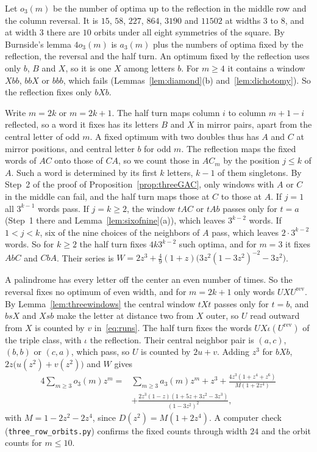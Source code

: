 \begin{remark}\label{rem:threeorbits}
Let $o_3(m)$ be the number of optima up to the reflection in the middle row and the column
reversal. It is $15$, $58$, $227$, $864$, $3190$ and $11502$ at widths $3$ to $8$, and at
width $3$ there are $10$ orbits under all eight symmetries of the square. By Burnside's lemma
$4o_3(m)$ is $a_3(m)$ plus the numbers of optima fixed by the reflection, the reversal and the
half turn. An optimum fixed by the reflection uses only $b$, $B$ and $X$, so it is one $X$
among letters $b$. For $m\ge4$ it contains a window $Xbb$, $bbX$ or $bbb$, which fails
(Lemmas~\ref{lem:diamond}(b) and~\ref{lem:dichotomy}). So the reflection fixes only $bXb$.

Write $m=2k$ or $m=2k+1$. The half turn maps column $i$ to column $m+1-i$ reflected, so a word
it fixes has its letters $B$ and $X$ in mirror pairs, apart from the central letter of odd $m$.
A fixed optimum with two doubles thus has $A$ and $C$ at mirror positions, and central letter
$b$ for odd $m$. The reflection maps the fixed words of $AC$ onto those of $CA$, so we count
those in $AC_m$ by the position $j\le k$ of $A$. Such a word is determined by its first $k$
letters, $k-1$ of them singletons. By Step~2 of the proof of Proposition~\ref{prop:threeGAC},
only windows with $A$ or $C$ in the middle can fail, and the half turn maps those at $C$ to
those at $A$. If $j=1$ all $3^{k-1}$ words pass. If $j=k\ge2$, the window $tAC$ or $tAb$ passes
only for $t=a$ (Step~1 there and Lemma~\ref{lem:sixofnine}(a)), which leaves $3^{k-2}$ words. If
$1<j<k$, six of the nine choices of the neighbors of $A$ pass, which leaves $2\cdot3^{k-2}$
words. So for $k\ge2$ the half turn fixes $4k3^{k-2}$ such optima, and for $m=3$ it fixes $AbC$
and $CbA$. Their series is $W=2z^3+\frac49(1+z)\bigl(3z^2(1-3z^2)^{-2}-3z^2\bigr)$.

A palindrome has every letter off the center an even number of times. So the reversal fixes no
optimum of even width, and for $m=2k+1$ only words $UXU^{\mathrm{rev}}$. By
Lemma~\ref{lem:threewindows} the central window $tXt$ passes only for $t=b$, and $bsX$ and $Xsb$
make the letter at distance two from $X$ outer, so $U$ read outward from $X$ is counted by $v$
in~\eqref{eq:runs}. The half turn fixes the words $UX\iota(U^{\mathrm{rev}})$ of the triple
class, with $\iota$ the reflection. Their central neighbor pair is $(a,c)$, $(b,b)$ or $(c,a)$,
which pass, so $U$ is counted by $2u+v$. Adding $z^3$ for $bXb$, $2z\bigl(u(z^2)+v(z^2)\bigr)$ and $W$ gives
\begin{align*}
4\sum_{m\ge3}o_3(m)z^m={}&\sum_{m\ge3}a_3(m)z^m+z^3+\frac{4z^3(1+z^4+z^6)}{M(1+2z^4)}\\
&+\frac{2z^3(1-z)(1+5z+3z^2-3z^3)}{(1-3z^2)^2},
\end{align*}
with $M=1-2z^2-2z^4$, since $D(z^2)=M(1+2z^4)$. A computer check
(\nolinkurl{three_row_orbits.py}) confirms the fixed counts through width $24$ and the orbit
counts for $m\le10$.
\end{remark}
